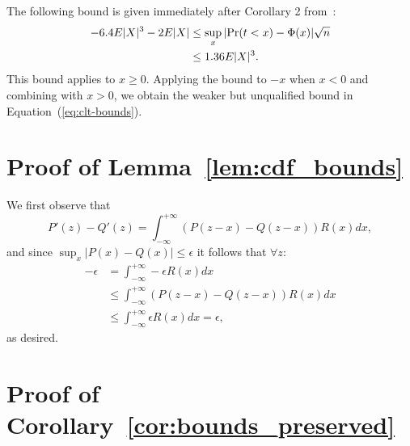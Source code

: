 \documentclass[twoside]{article} \usepackage{aistats2017}
\begin{document}
The following bound is given immediately after Corollary 2 from~\citet{explicit-clt05}:
\begin{align*}
-6.4E|X|^3-2E|X| &\leq \sup_x|{\rm Pr}(t<x)-\Phi(x)|{\sqrt{n}} \\
&\leq 1.36E|X|^3.
\end{align*}
This bound applies to $x\geq 0$. Applying the bound to $-x$ when $x<0$
and combining with $x>0$, we obtain the weaker but unqualified bound
in Equation~(\ref{eq:clt-bounds}).



\section{Proof of Lemma~\ref{lem:cdf_bounds}}\label{app:proof_cdf_bounds}

We first observe that
\[
    P'(z) - Q'(z) = \int_{-\infty}^{+\infty}(P(z-x)-Q(z-x))R(x) dx,
\]
and since $\sup_x|P(x)-Q(x)|\leq \epsilon$ it follows that $\forall z$:
\begin{align*}
-\epsilon &= \int_{-\infty}^{+\infty} -\epsilon R(x) dx \\
&\leq \int_{-\infty}^{+\infty}(P(z-x)-Q(z-x))R(x) dx \\
&\leq \int_{-\infty}^{+\infty}\epsilon R(x) dx = \epsilon,
\end{align*}
as desired.



\section{Proof of Corollary~\ref{cor:bounds_preserved}}\label{app:bounds_preserved}
\end{document}
